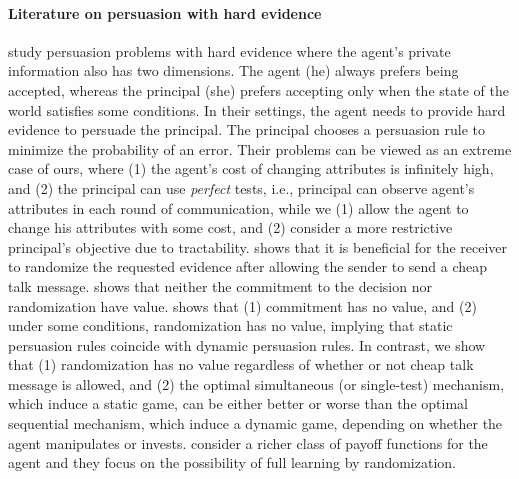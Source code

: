 \paragraph{Literature on persuasion with hard evidence}
\citet{glazer2004optimal,glazer2006study,sher2014persuasion}  study persuasion problems with hard evidence where the agent's private information also has two dimensions. 
 The agent (he) always prefers being accepted, whereas the principal (she) prefers accepting only when the state of the world satisfies some conditions.
 In their settings, the agent needs to provide hard evidence to persuade the principal.
 The principal chooses a persuasion rule to minimize the probability of an error.
 Their problems can be viewed as an extreme case of ours, where (1) the agent's cost of changing attributes is infinitely high, and (2) the principal can use \emph{perfect} tests, i.e., principal can observe agent's attributes in each round of communication, while we (1) allow the agent to change his attributes with some cost, and (2) consider a  more restrictive principal's objective due to tractability. 
\citet{glazer2004optimal} shows that it is beneficial for the receiver to randomize the requested evidence after allowing the sender to send a cheap talk message.
 \citet{glazer2006study} shows that neither the commitment to the decision nor randomization have value.
\citet{sher2014persuasion} shows that (1) commitment has no value, and (2) under some conditions, randomization has no value, implying that static persuasion rules coincide with dynamic persuasion rules.
In contrast, we show that (1) randomization has no value regardless of whether or not cheap talk message is allowed, and (2) the optimal simultaneous (or single-test) mechanism, which induce a static game, can be either better or worse than the optimal sequential mechanism, which induce a dynamic game, depending on  whether the agent manipulates or invests.
\citet{Carroll_Egorov} consider a richer class of payoff functions for the agent and they focus on the possibility of full learning by randomization.


